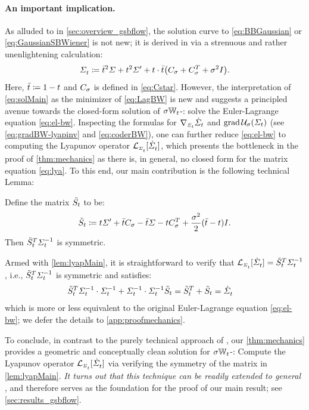 \paragraph{An important implication.}
As alluded to in \cref{sec:overview_gsbflow}, the solution curve to \eqref{eq:BBGaussian} or \eqref{eq:GaussianSBWiener} is not new; it is derived in \citet{mallasto2021entropy} via a strenuous and rather unenlightening calculation:
\begin{equation}
\label{eq:solMain}
\Sigmasol \defeq \ctimebar^2 \Sigma + \ctime^2 \Sigma' + \ctime\cdot\ctimebar\parens*{\C+\C^T + \sigma^2 \eye}.
\end{equation}
Here, $\bar{t} \coloneqq 1-t$ and $C_{\sigma}$ is defined in \eqref{eq:Cstar}. However, the interpretation of \eqref{eq:solMain} as the minimizer of \eqref{eq:LagBW} is new and suggests a principled avenue towards the closed-form solution of $\sigma\mathbb{W}_{t}$-: solve the Euler-Lagrange equation \eqref{eq:el-bw}.
Inspecting the formulas for $\nabla_{\scriptscriptstyle\dot{\Sigma}_{t}}\dot{\Sigma}_{t}$ and $\gradBW \penergyBW$ (see \eqref{eq:gradBW-lyapinv} and \eqref{eq:coderBW}), one can further reduce \eqref{eq:el-bw} to computing the Lyapunov operator $\lyap$, which presents the bottleneck in the proof of \cref{thm:mechanics} as there is, in general, no closed form for the matrix equation \eqref{eq:lya}. To this end, our main contribution is the following technical Lemma:
\begin{lemma}\label{lem:lyapMain}
Define the matrix $\tilde{S_{t}}$ to be:
\begin{equation}
\label{eq:HtMain}
\tilde{S}_{t} \coloneqq t\Sigma' + \bar{t} C_{\sigma} - \bar{t}\Sigma - tC_{\sigma}^T  + \frac{\sigma^2}{2}(\bar{t}-t)I.
\end{equation}Then $\tilde{S}_{t}^T \Sigma^{-1}_{ t }$ is symmetric.
\end{lemma}
Armed with \cref{lem:lyapMain}, it is straightforward to verify that $\lyap = \Ht^T \Sigmasolinv$, i.e., $\tilde{S}_{t}^T  \Sigma^{-1}_{ t }$ is symmetric and satisfies:
\begin{align}
   \tilde{S}_{t}^T \Sigma^{-1}_{ t } \cdot \Sigma^{-1}_{ t } + \Sigma^{-1}_{ t } \cdot\Sigma^{-1}_{ t } \tilde{S}_{t} &= \tilde{S}_{t}^T  +  \tilde{S}_{t}= \dot{\Sigma}^{}_{ t }
\end{align}which is more or less equivalent to the original Euler-Lagrange equation \eqref{eq:el-bw}; we defer the details to \cref{app:proofmechanics}.

To conclude, in contrast to the purely technical approach of \citet{mallasto2021entropy}, our \cref{thm:mechanics} provides a geometric and conceptually clean solution for $\sigma\mathbb{W}_{t}$-: Compute the Lyapunov operator $\lyap$ via verifying the symmetry of the matrix in \cref{lem:lyapMain}. \emph{It turns out that this technique can be readily extended to general }, and therefore serves as the foundation for the proof of our main result; see \cref{sec:results_gsbflow}.

